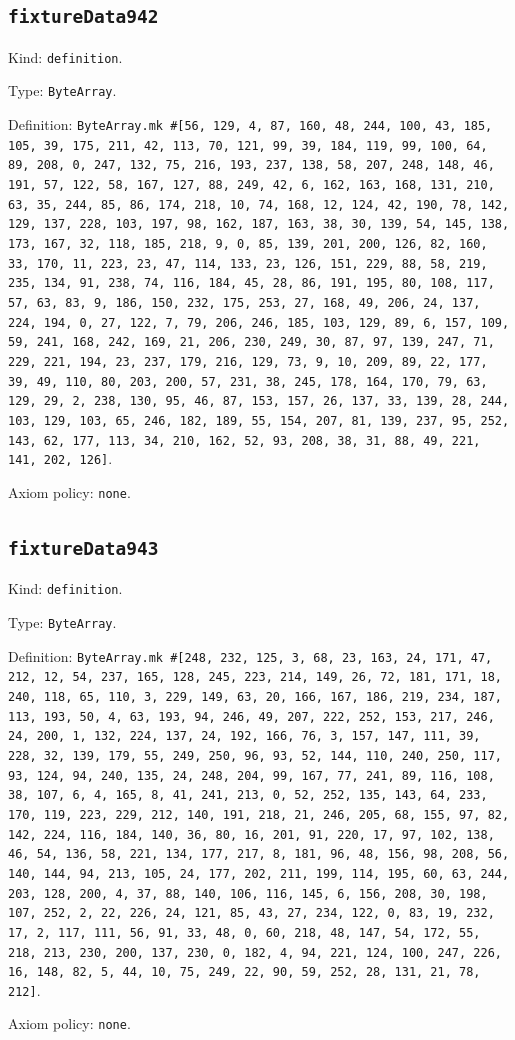 \documentclass[11pt]{article}
\begin{document}
\subsection*{\texttt{fixtureData942}}
\noindent Kind: \texttt{definition}.\par
\noindent Type: \texttt{ByteArray}.\par
\noindent Definition: \texttt{ByteArray.mk \#[56, 129, 4, 87, 160, 48, 244, 100, 43, 185, 105, 39, 175, 211, 42, 113, 70, 121, 99, 39, 184, 119, 99, 100, 64, 89, 208, 0, 247, 132, 75, 216, 193, 237, 138, 58, 207, 248, 148, 46, 191, 57, 122, 58, 167, 127, 88, 249, 42, 6, 162, 163, 168, 131, 210, 63, 35, 244, 85, 86, 174, 218, 10, 74, 168, 12, 124, 42, 190, 78, 142, 129, 137, 228, 103, 197, 98, 162, 187, 163, 38, 30, 139, 54, 145, 138, 173, 167, 32, 118, 185, 218, 9, 0, 85, 139, 201, 200, 126, 82, 160, 33, 170, 11, 223, 23, 47, 114, 133, 23, 126, 151, 229, 88, 58, 219, 235, 134, 91, 238, 74, 116, 184, 45, 28, 86, 191, 195, 80, 108, 117, 57, 63, 83, 9, 186, 150, 232, 175, 253, 27, 168, 49, 206, 24, 137, 224, 194, 0, 27, 122, 7, 79, 206, 246, 185, 103, 129, 89, 6, 157, 109, 59, 241, 168, 242, 169, 21, 206, 230, 249, 30, 87, 97, 139, 247, 71, 229, 221, 194, 23, 237, 179, 216, 129, 73, 9, 10, 209, 89, 22, 177, 39, 49, 110, 80, 203, 200, 57, 231, 38, 245, 178, 164, 170, 79, 63, 129, 29, 2, 238, 130, 95, 46, 87, 153, 157, 26, 137, 33, 139, 28, 244, 103, 129, 103, 65, 246, 182, 189, 55, 154, 207, 81, 139, 237, 95, 252, 143, 62, 177, 113, 34, 210, 162, 52, 93, 208, 38, 31, 88, 49, 221, 141, 202, 126]}.\par
\noindent Axiom policy: \texttt{none}.\par
\subsection*{\texttt{fixtureData943}}
\noindent Kind: \texttt{definition}.\par
\noindent Type: \texttt{ByteArray}.\par
\noindent Definition: \texttt{ByteArray.mk \#[248, 232, 125, 3, 68, 23, 163, 24, 171, 47, 212, 12, 54, 237, 165, 128, 245, 223, 214, 149, 26, 72, 181, 171, 18, 240, 118, 65, 110, 3, 229, 149, 63, 20, 166, 167, 186, 219, 234, 187, 113, 193, 50, 4, 63, 193, 94, 246, 49, 207, 222, 252, 153, 217, 246, 24, 200, 1, 132, 224, 137, 24, 192, 166, 76, 3, 157, 147, 111, 39, 228, 32, 139, 179, 55, 249, 250, 96, 93, 52, 144, 110, 240, 250, 117, 93, 124, 94, 240, 135, 24, 248, 204, 99, 167, 77, 241, 89, 116, 108, 38, 107, 6, 4, 165, 8, 41, 241, 213, 0, 52, 252, 135, 143, 64, 233, 170, 119, 223, 229, 212, 140, 191, 218, 21, 246, 205, 68, 155, 97, 82, 142, 224, 116, 184, 140, 36, 80, 16, 201, 91, 220, 17, 97, 102, 138, 46, 54, 136, 58, 221, 134, 177, 217, 8, 181, 96, 48, 156, 98, 208, 56, 140, 144, 94, 213, 105, 24, 177, 202, 211, 199, 114, 195, 60, 63, 244, 203, 128, 200, 4, 37, 88, 140, 106, 116, 145, 6, 156, 208, 30, 198, 107, 252, 2, 22, 226, 24, 121, 85, 43, 27, 234, 122, 0, 83, 19, 232, 17, 2, 117, 111, 56, 91, 33, 48, 0, 60, 218, 48, 147, 54, 172, 55, 218, 213, 230, 200, 137, 230, 0, 182, 4, 94, 221, 124, 100, 247, 226, 16, 148, 82, 5, 44, 10, 75, 249, 22, 90, 59, 252, 28, 131, 21, 78, 212]}.\par
\noindent Axiom policy: \texttt{none}.\par
\end{document}
